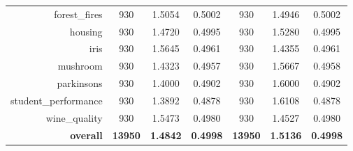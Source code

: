 \begin{table}[htbp]
{\begin{tabular}{rcccccc}
                  forest\_fires                      & 930                                        & 1.5054                                                                             & 0.5002          & 930                               & \cellcolor[rgb]{ .776,  .937,  .808}\textcolor[rgb]{ 0,  .38,  0}{1.4946} & 0.5002          \\
                  housing                            & 930                                        & \cellcolor[rgb]{ .776,  .937,  .808}\textcolor[rgb]{ 0,  .38,  0}{1.4720}          & 0.4995          & 930                               & 1.5280                                                                    & 0.4995          \\
                  iris                               & 930                                        & 1.5645                                                                             & 0.4961          & 930                               & \cellcolor[rgb]{ .776,  .937,  .808}\textcolor[rgb]{ 0,  .38,  0}{1.4355} & 0.4961          \\
                  mushroom                           & 930                                        & \cellcolor[rgb]{ .776,  .937,  .808}\textcolor[rgb]{ 0,  .38,  0}{1.4323}          & 0.4957          & 930                               & 1.5667                                                                    & 0.4958          \\
                  parkinsons                         & 930                                        & \cellcolor[rgb]{ .776,  .937,  .808}\textcolor[rgb]{ 0,  .38,  0}{1.4000}          & 0.4902          & 930                               & 1.6000                                                                    & 0.4902          \\
                  student\_performance               & 930                                        & \cellcolor[rgb]{ .776,  .937,  .808}\textcolor[rgb]{ 0,  .38,  0}{1.3892}          & 0.4878          & 930                               & 1.6108                                                                    & 0.4878          \\
                  wine\_quality                      & 930                                        & 1.5473                                                                             & 0.4980          & 930                               & \cellcolor[rgb]{ .776,  .937,  .808}\textcolor[rgb]{ 0,  .38,  0}{1.4527} & 0.4980          \\
                  \midrule
                  \textbf{overall}                   & \textbf{13950}                             & \cellcolor[rgb]{ .776,  .937,  .808}\textcolor[rgb]{ 0,  .38,  0}{\textbf{1.4842}} & \textbf{0.4998} & \textbf{13950}                    & \textbf{1.5136}                                                           & \textbf{0.4998} \\
            \end{tabular}%
      }
\end{table}%

